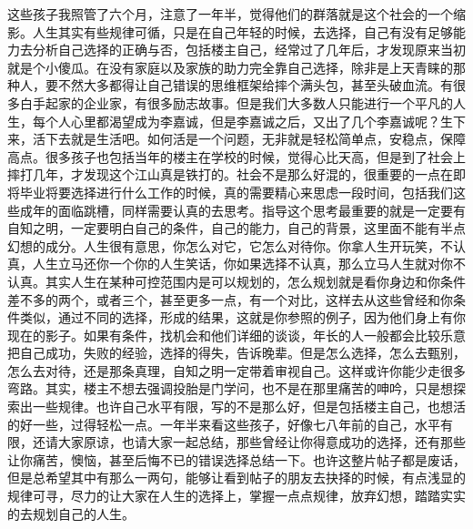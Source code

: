 这些孩子我照管了六个月，注意了一年半，觉得他们的群落就是这个社会的一个缩影。人生其实有些规律可循，只是在自己年轻的时候，去选择，自己有没有足够能力去分析自己选择的正确与否，包括楼主自己，经常过了几年后，才发现原来当初就是个小傻瓜。在没有家庭以及家族的助力完全靠自己选择，除非是上天青睐的那种人，要不然大多都得让自己错误的思维框架给摔个满头包，甚至头破血流。有很多白手起家的企业家，有很多励志故事。但是我们大多数人只能进行一个平凡的人生，每个人心里都渴望成为李嘉诚，但是李嘉诚之后，又出了几个李嘉诚呢？生下来，活下去就是生活吧。如何活是一个问题，无非就是轻松简单点，安稳点，保障高点。很多孩子也包括当年的楼主在学校的时候，觉得心比天高，但是到了社会上摔打几年，才发现这个江山真是铁打的。社会不是那么好混的，很重要的一点在即将毕业将要选择进行什么工作的时候，真的需要精心来思虑一段时间，包括我们这些成年的面临跳槽，同样需要认真的去思考。指导这个思考最重要的就是一定要有自知之明，一定要明白自己的条件，自己的能力，自己的背景，这里面不能有半点幻想的成分。人生很有意思，你怎么对它，它怎么对待你。你拿人生开玩笑，不认真，人生立马还你一个你的人生笑话，你如果选择不认真，那么立马人生就对你不认真。其实人生在某种可控范围内是可以规划的，怎么规划就是看你身边和你条件差不多的两个，或者三个，甚至更多一点，有一个对比，这样去从这些曾经和你条件类似，通过不同的选择，形成的结果，这就是你参照的例子，因为他们身上有你现在的影子。如果有条件，找机会和他们详细的谈谈，年长的人一般都会比较乐意把自己成功，失败的经验，选择的得失，告诉晚辈。但是怎么选择，怎么去甄别，怎么去对待，还是那条真理，自知之明一定带着审视自己。这样或许你能少走很多弯路。其实，楼主不想去强调投胎是门学问，也不是在那里痛苦的呻吟，只是想探索出一些规律。也许自己水平有限，写的不是那么好，但是包括楼主自己，也想活的好一些，过得轻松一点。一年半来看这些孩子，好像七八年前的自己，水平有限，还请大家原谅，也请大家一起总结，那些曾经让你得意成功的选择，还有那些让你痛苦，懊恼，甚至后悔不已的错误选择总结一下。也许这整片帖子都是废话，但是总希望其中有那么一两句，能够让看到帖子的朋友去抉择的时候，有点浅显的规律可寻，尽力的让大家在人生的选择上，掌握一点点规律，放弃幻想，踏踏实实的去规划自己的人生。


